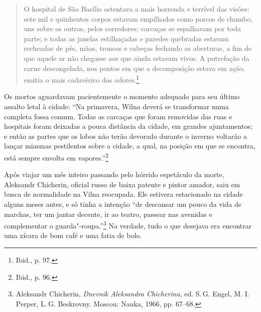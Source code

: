 \begin{quote}
O hospital de São Basílio ostentava a mais horrenda e terrível das
visões: sete mil e quinhentos corpos estavam empilhados como porcos de
chumbo, uns sobre os outros, pelos corredores; carcaças se espalhavam
por toda parte; e todas as janelas estilhaçadas e paredes quebradas
estavam recheadas de pés, mãos, troncos e cabeças fechando as aberturas,
a fim de que aquele ar não chegasse aos que ainda estavam vivos. A
putrefação da carne descongelada, nos pontos em que a decomposição
estava em ação, emitia o mais cadavérico dos odores.\footnote{Ibid., p.
  97.}
\end{quote}  

Os mortos aguardavam pacientemente o momento adequado para seu último
assalto letal à cidade: ``Na primavera, Wilna deverá se transformar numa
completa fossa comum. Todas as carcaças que foram removidas das ruas e
hospitais foram deixadas a pouca distância da cidade, em grandes
ajuntamentos; e então as partes que os lobos não terão devorado durante
o inverno voltarão a lançar miasmas pestilentos sobre a cidade, a qual,
na posição em que se encontra, está sempre envolta em
vapores.''\footnote{Ibid., p. 96.}

Após viajar um mês inteiro passando pelo hórrido espetáculo da morte,
Aleksandr Chicherin, oficial russo de baixa patente e pintor amador,
saiu em busca de normalidade na Vilna reocupada. Ele estivera
estacionado na cidade alguns meses antes, e só tinha a intenção ``de
descansar um pouco da vida de marchas, ter um jantar decente, ir ao
teatro, passear nas avenidas e complementar o guarda"-roupa.''\footnote{Aleksandr
  Chicherin, \emph{Dnevnik Aleksandra Chicherina}, ed. S.\,G. Engel, M.
  I. Perper, L.\,G. Beskrovny. Moscou: Nauka, 1966, pp. 67--68.} Na
verdade, tudo o que desejava era encontrar uma xícara de bom café e uma
fatia de bolo.

